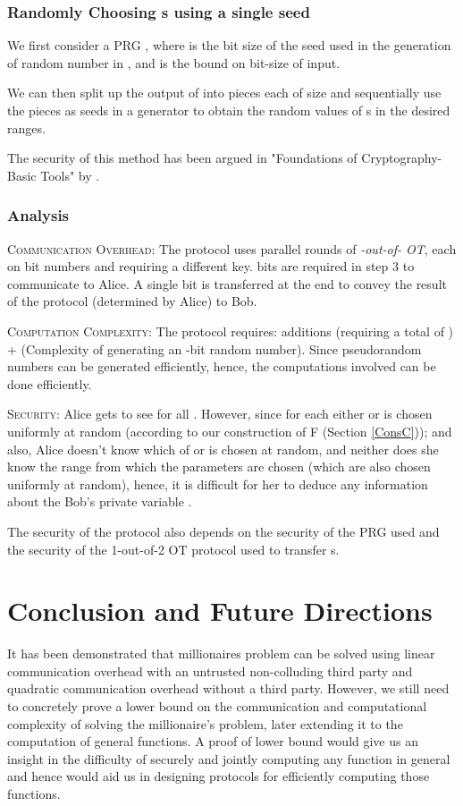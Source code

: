 \documentclass[11pt, letterpaper, romanappendices, onecolumn]{article}
\theoremstyle{plain}\newtheorem{thm}{Theorem}[section]
\theoremstyle{definition}
\theoremstyle{remark}
\begin{document}
\subsubsection{Randomly Choosing s using a single seed } \label{sec:prg}
\par We first consider a PRG , where  is the bit size of the seed  used in the generation of random number in , and  is the bound on bit-size of input.

\par We can then split up the output of  into  pieces each of size  and sequentially use the  pieces as seeds in a generator  to obtain the random values of s in the desired ranges.

The security of this method has been argued in "Foundations of Cryptography-Basic Tools" by \citet{Goldreich01book}.

\subsubsection{Analysis}
\textsc{Communication Overhead:} The protocol uses  parallel rounds of \textit{-out-of- OT}, each on  bit numbers and requiring a different key.  bits are required in step 3 to communicate  to Alice. A single bit is transferred at the end to convey the result of the protocol (determined by Alice) to Bob. 

\textsc{Computation Complexity:} The protocol requires:  additions (requiring a total of ) +   (Complexity of generating an -bit random number). Since pseudorandom numbers can be generated efficiently, hence, the computations involved can be done efficiently.

\textsc{Security:}
Alice gets to see  for all . However, since for each  either  or  is chosen uniformly at random (according to our construction of F (Section \ref{ConsC})); and also, Alice doesn't know which of  or  is chosen at random, and neither does she know the range from which the parameters  are chosen (which are also chosen uniformly at random), hence, it is difficult for her to deduce any information about the Bob's private variable .
\par The security of the protocol also depends on the security of the PRG used and the security of the 1-out-of-2 OT protocol used to transfer s.

\section{Conclusion and Future Directions}\label{sec4}
\par It has been demonstrated that millionaires problem can be solved using linear communication overhead with an untrusted non-colluding third party and quadratic communication overhead without a third party. However, we still need to concretely prove a lower bound on the communication and computational complexity of solving the millionaire's problem, later extending it to the computation of general functions. A proof of lower bound would give us an insight in the difficulty of securely and jointly computing any function in general and hence would aid us in designing protocols for efficiently computing those functions.
\end{document}
